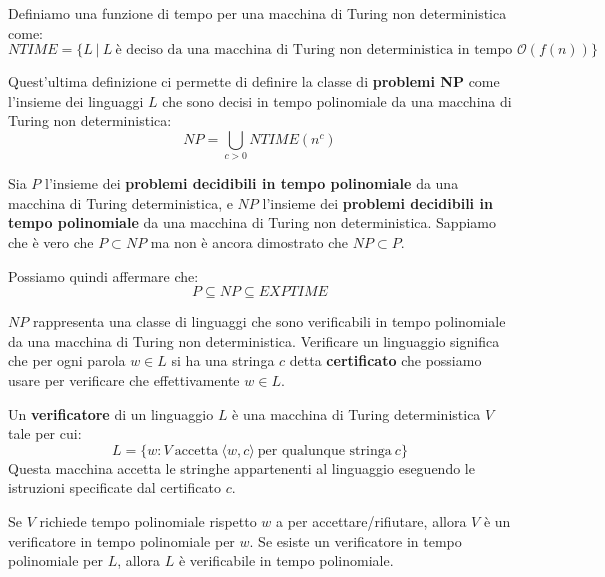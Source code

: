 \begin{definizione}
    Definiamo una funzione di tempo per una macchina di Turing non deterministica come:
    \begin{equation}
        NTIME = \{L \ | \ L \ \text{è deciso da una macchina di Turing non deterministica in tempo } \mathcal{O}(f(n))\}
    \end{equation}
\end{definizione}

Quest'ultima definizione ci permette di definire la classe di \textbf{problemi NP} come l'insieme dei linguaggi $L$ che sono decisi in tempo polinomiale da una macchina di Turing non deterministica:
\begin{equation}
    NP = \bigcup_{c > 0} NTIME(n^c)
\end{equation}
\begin{osservazione}
Sia $P$ l'insieme dei \textbf{problemi decidibili in tempo polinomiale} da una macchina di Turing deterministica, e $NP$ l'insieme dei \textbf{problemi decidibili in tempo polinomiale} da una macchina di Turing non deterministica. Sappiamo che è vero che $P \subset NP$ ma non è ancora dimostrato che $NP \subset P$.
\end{osservazione}

Possiamo quindi affermare che:
\begin{equation}
    P \subseteq NP \subseteq EXPTIME
\end{equation}

$NP$ rappresenta una classe di linguaggi che sono verificabili in tempo polinomiale da una macchina di Turing non deterministica. Verificare un linguaggio significa che per ogni parola $w \in L$ si ha una stringa $c$ detta \textbf{certificato} che possiamo usare per verificare che effettivamente $w \in L$.
\begin{definizione}
    Un \textbf{verificatore} di un linguaggio $L$ è una macchina di Turing deterministica $V$ tale per cui:
    \begin{equation}
        L = \{w : V \ \text{accetta} \ \langle w, c \rangle \ \text{per qualunque stringa} \ c\}
    \end{equation}
    Questa macchina accetta le stringhe appartenenti al linguaggio eseguendo le istruzioni specificate dal certificato $c$.
\end{definizione}

Se $V$ richiede tempo polinomiale rispetto $w$ a per accettare/rifiutare, allora $V$ è un verificatore in tempo polinomiale per $w$. Se esiste un verificatore in tempo polinomiale per $L$, allora $L$ è verificabile in tempo polinomiale. 

